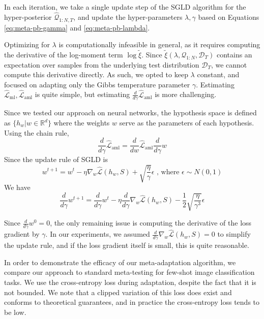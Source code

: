 \documentclass{article}
\theoremstyle{definition}
\begin{document}
In each iteration, we take a single update step of the SGLD algorithm for the hyper-posterior $\hat{\mathcal{Q}}_{1:N, T}$, and update the hyper-parameters $\lambda,\gamma$ based on Equations \ref{eq:meta-pb-gamma} and \ref{eq:meta-pb-lambda}.

Optimizing for $\lambda$ is computationally infeasible in general, as it requires computing the derivative of the log-moment term $\log\tilde{\xi}$. Since $\tilde{\xi}(\lambda, \mathcal{Q}_{1:N},\mathcal{D}_T)$ contains an expectation over samples from the underlying test distribution $\mathcal{D}_T$, we cannot compute this derivative directly. As such, we opted to keep $\lambda$ constant, and focused on adapting only the Gibbs temperature parameter $\gamma$.
Estimating $\hat{\mathcal{L}}_{\mathrm{ml}},\hat{\mathcal{L}}_{\mathrm{aml}}$ is quite simple, but estimating $\frac{d}{d\gamma}\hat{\mathcal{L}}_{\mathrm{aml}}$ is more challenging.

Since we tested our approach on neural networks, the hypothesis space is defined as $\{h_w|w\in \mathbb{R}^d\}$ where the weights $w$ serve as the parameters of each hypothesis.
Using the chain rule, 
$$\frac{d}{d\gamma}\hat{\mathcal{L}}_{\mathrm{aml}}=\frac{d}{dw}\hat{\mathcal{L}}_{\mathrm{aml}}\frac{d}{d\gamma}w$$
Since the update rule of SGLD is 
$$w^{t+1}=w^t-\eta\nabla_w \hat{\mathcal{L}}(h_w,S)+\sqrt{\frac{\eta}{\gamma}}\epsilon \text{ , where } \epsilon\sim N(0,1)$$
We have
\begin{equation}
\frac{d}{d\gamma}w^{t+1}=\frac{d}{d\gamma}w^t-\eta\frac{d}{d\gamma}\nabla_w \hat{\mathcal{L}}(h_w,S)-\frac{1}{2}\sqrt{\frac{\eta}{\gamma^3}}\epsilon
\end{equation}

Since $\frac{d}{d\gamma}w^0=0$, the only remaining issue is computing the derivative of the loss gradient by $\gamma$. In our experiments, we assumed $\frac{d}{d\gamma}\nabla_w \hat{\mathcal{L}}(h_w,S)=0$ to simplify the update rule, and if the loss gradient itself is small, this is quite reasonable.

In order to demonstrate the efficacy of our meta-adaptation algorithm, we compare our approach to standard meta-testing for few-shot image classification tasks. 
We use the cross-entropy loss during adaptation, despite the fact that it is not bounded. We note that a clipped variation of this loss does exist and conforms to theoretical guarantees, and in practice the cross-entropy loss tends to be low.
\end{document}
